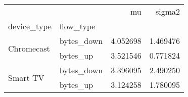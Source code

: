 \begin{tabular}{llrr}
\toprule
 &  & mu & sigma2 \\
device_type & flow_type &  &  \\
\midrule
\multirow[t]{2}{*}{Chromecast} & bytes_down & 4.052698 & 1.469476 \\
 & bytes_up & 3.521546 & 0.771824 \\
\cline{1-4}
\multirow[t]{2}{*}{Smart TV} & bytes_down & 3.396095 & 2.490250 \\
 & bytes_up & 3.124258 & 1.780095 \\
\cline{1-4}
\bottomrule
\end{tabular}

